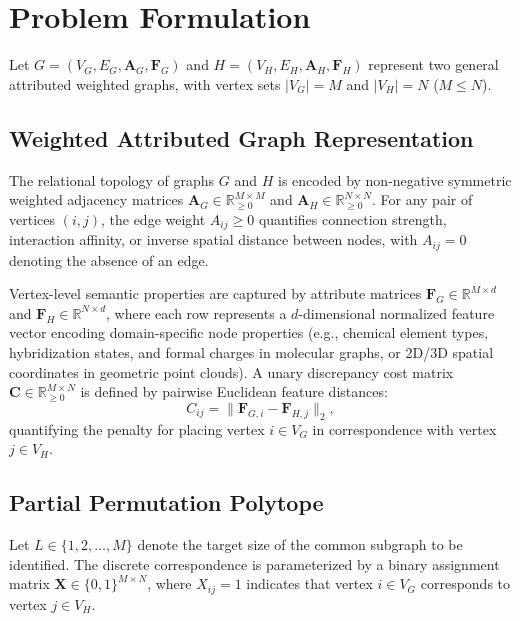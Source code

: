 \documentclass[conference]{IEEEtran}
\begin{document}
\section{Problem Formulation}
\label{sec:formulation}

Let $G = (V_G, E_G, \mathbf{A}_G, \mathbf{F}_G)$ and $H = (V_H, E_H, \mathbf{A}_H, \mathbf{F}_H)$ represent two general attributed weighted graphs, with vertex sets $|V_G| = M$ and $|V_H| = N$ ($M \leq N$).

\subsection{Weighted Attributed Graph Representation}

The relational topology of graphs $G$ and $H$ is encoded by non-negative symmetric weighted adjacency matrices $\mathbf{A}_G \in \mathbb{R}_{\geq 0}^{M \times M}$ and $\mathbf{A}_H \in \mathbb{R}_{\geq 0}^{N \times N}$. For any pair of vertices $(i, j)$, the edge weight $A_{ij} \geq 0$ quantifies connection strength, interaction affinity, or inverse spatial distance between nodes, with $A_{ij} = 0$ denoting the absence of an edge.

Vertex-level semantic properties are captured by attribute matrices $\mathbf{F}_G \in \mathbb{R}^{M \times d}$ and $\mathbf{F}_H \in \mathbb{R}^{N \times d}$, where each row represents a $d$-dimensional normalized feature vector encoding domain-specific node properties (e.g., chemical element types, hybridization states, and formal charges in molecular graphs, or 2D/3D spatial coordinates in geometric point clouds). A unary discrepancy cost matrix $\mathbf{C} \in \mathbb{R}_{\geq 0}^{M \times N}$ is defined by pairwise Euclidean feature distances:
\begin{equation}
C_{ij} = \|\mathbf{F}_{G, i} - \mathbf{F}_{H, j}\|_2,
\label{eq:unary_cost}
\end{equation}
quantifying the penalty for placing vertex $i \in V_G$ in correspondence with vertex $j \in V_H$.

\subsection{Partial Permutation Polytope}

Let $L \in \{1, 2, \ldots, M\}$ denote the target size of the common subgraph to be identified. The discrete correspondence is parameterized by a binary assignment matrix $\mathbf{X} \in \{0, 1\}^{M \times N}$, where $X_{ij} = 1$ indicates that vertex $i \in V_G$ corresponds to vertex $j \in V_H$.
\end{document}
